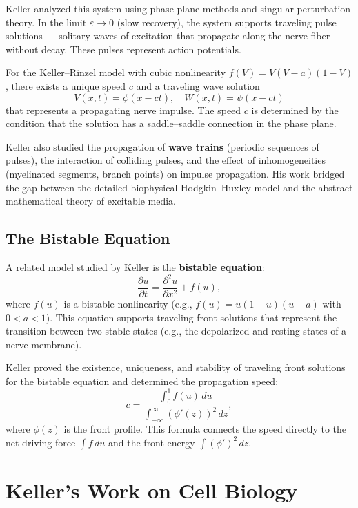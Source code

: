 Keller analyzed this system using phase-plane methods and singular perturbation theory. In the limit \(\varepsilon \to 0\) (slow recovery), the system supports traveling pulse solutions --- solitary waves of excitation that propagate along the nerve fiber without decay. These pulses represent action potentials.

\begin{theorem}
For the Keller--Rinzel model with cubic nonlinearity \(f(V) = V(V-a)(1-V)\), there exists a unique speed \(c\) and a traveling wave solution
\[
V(x, t) = \phi(x - ct), \quad W(x, t) = \psi(x - ct)
\]
that represents a propagating nerve impulse. The speed \(c\) is determined by the condition that the solution has a saddle--saddle connection in the phase plane.
\end{theorem}

Keller also studied the propagation of \textbf{wave trains} (periodic sequences of pulses), the interaction of colliding pulses, and the effect of inhomogeneities (myelinated segments, branch points) on impulse propagation. His work bridged the gap between the detailed biophysical Hodgkin--Huxley model and the abstract mathematical theory of excitable media.

\subsection{The Bistable Equation}

A related model studied by Keller is the \textbf{bistable equation}:
\[
\frac{\partial u}{\partial t} = \frac{\partial^2 u}{\partial x^2} + f(u),
\]
where \(f(u)\) is a bistable nonlinearity (e.g., \(f(u) = u(1-u)(u-a)\) with \(0 < a < 1\)). This equation supports traveling front solutions that represent the transition between two stable states (e.g., the depolarized and resting states of a nerve membrane).

Keller proved the existence, uniqueness, and stability of traveling front solutions for the bistable equation and determined the propagation speed:
\[
c = \frac{\int_0^1 f(u)\, du}{\int_{-\infty}^\infty (\phi'(z))^2\, dz},
\]
where \(\phi(z)\) is the front profile. This formula connects the speed directly to the net driving force \(\int f\, du\) and the front energy \(\int (\phi')^2\, dz\).

\section{Keller's Work on Cell Biology}

